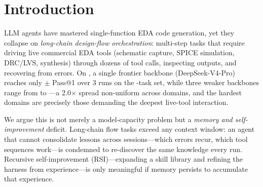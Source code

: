 \section{Introduction}
\label{sec:intro}

LLM agents have mastered single-function EDA code generation, yet they collapse on \emph{long-chain design-flow orchestration}: multi-step tasks that require driving live commercial EDA tools (schematic capture, SPICE simulation, DRC/LVS, synthesis) through dozens of tool calls, inspecting outputs, and recovering from errors. On \bench, a single frontier backbone (DeepSeek-V4-Pro) reaches only \MzeroPass{}$\pm$\MzeroStd{} Pass@1 over 3 runs on the \Ncases{}-task set, while three weaker backbones range from \DoubaoMini{} to \DoubaoPro{}---a 2.0$\times$ spread non-uniform across domains, and the hardest domains are precisely those demanding the deepest live-tool interaction.

We argue this is not merely a model-capacity problem but a \emph{memory and self-improvement} deficit. Long-chain flow tasks exceed any context window: an agent that cannot consolidate lessons across sessions---which errors recur, which tool sequences work---is condemned to re-discover the same knowledge every run. Recursive self-improvement (RSI)---expanding a skill library and refining the harness from experience---is only meaningful if memory persists to accumulate that experience.

